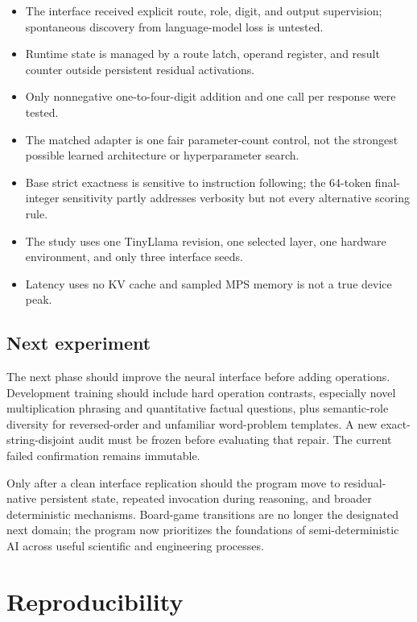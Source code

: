\documentclass[11pt]{article}
\begin{document}
\begin{itemize}
\item The interface received explicit route, role, digit, and output
      supervision; spontaneous discovery from language-model loss is untested.
\item Runtime state is managed by a route latch, operand register, and result
      counter outside persistent residual activations.
\item Only nonnegative one-to-four-digit addition and one call per response
      were tested.
\item The matched adapter is one fair parameter-count control, not the
      strongest possible learned architecture or hyperparameter search.
\item Base strict exactness is sensitive to instruction following; the
      64-token final-integer sensitivity partly addresses verbosity but not
      every alternative scoring rule.
\item The study uses one TinyLlama revision, one selected layer, one hardware
      environment, and only three interface seeds.
\item Latency uses no KV cache and sampled MPS memory is not a true device
      peak.
\end{itemize}

\subsection{Next experiment}

The next phase should improve the neural interface before adding operations.
Development training should include hard operation contrasts, especially
novel multiplication phrasing and quantitative factual questions, plus
semantic-role diversity for reversed-order and unfamiliar word-problem
templates. A new exact-string-disjoint audit must be frozen before evaluating
that repair. The current failed confirmation remains immutable.

Only after a clean interface replication should the program move to
residual-native persistent state, repeated invocation during reasoning, and
broader deterministic mechanisms. Board-game transitions are no longer the
designated next domain; the program now prioritizes the foundations of
semi-deterministic AI across useful scientific and engineering processes.

\section{Reproducibility}
\end{document}
